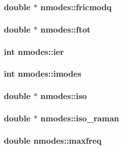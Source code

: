 \subsubsection{\setlength{\rightskip}{0pt plus 5cm}double $\ast$ {\bf nmodes::fricmodq}}\label{structnmodes_ea3b31c8a13bd4318613c66bd70423f8}


\subsubsection{\setlength{\rightskip}{0pt plus 5cm}double $\ast$ {\bf nmodes::ftot}}\label{structnmodes_b44402bf039e4940b4cf45194b2edc18}


\subsubsection{\setlength{\rightskip}{0pt plus 5cm}int {\bf nmodes::ier}}\label{structnmodes_6916dd9e2c4fd73a3596f8e36f99950b}


\subsubsection{\setlength{\rightskip}{0pt plus 5cm}int {\bf nmodes::imodes}}\label{structnmodes_350480fda04291218bf9d6afa1d206df}


\subsubsection{\setlength{\rightskip}{0pt plus 5cm}double $\ast$ {\bf nmodes::iso}}\label{structnmodes_65b1ae5416e2d793dd3f56f60efe527a}


\subsubsection{\setlength{\rightskip}{0pt plus 5cm}double $\ast$ {\bf nmodes::iso\_\-raman}}\label{structnmodes_b6a558303028c55b3f7e909dc5412ccf}


\subsubsection{\setlength{\rightskip}{0pt plus 5cm}double {\bf nmodes::maxfreq}}\label{structnmodes_bdec9d2af0661b0356a9848a00e1a013}


